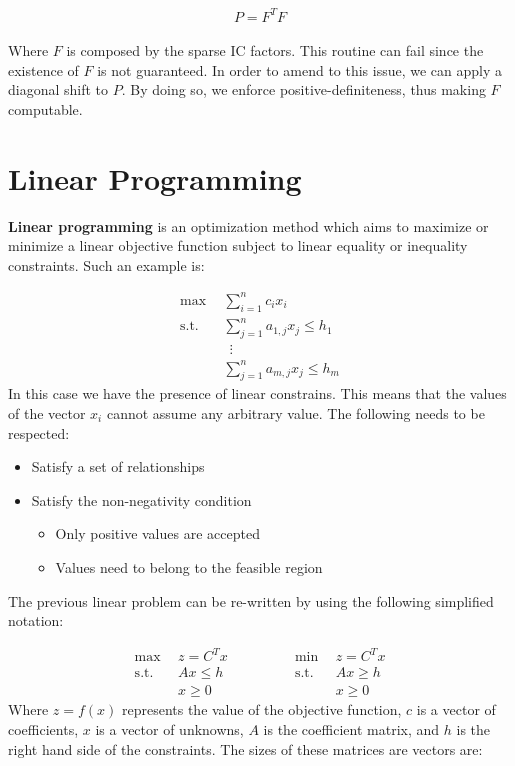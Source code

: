 \documentclass{article}
\begin{document}
\[ P = F^TF \] \\
Where $F$ is composed by the sparse IC factors. This routine can fail since the existence of $F$ is not guaranteed. In order to amend to this issue, we can apply a diagonal shift to $P$. By doing so, we enforce positive-definiteness, thus making $F$ computable.

\section{Linear Programming}
\textbf{Linear programming} is an optimization method which aims to maximize or minimize a linear objective function subject to linear equality or inequality constraints. Such an example is:

\begin{align*}
	\max~~ & \sum_{i = 1}^n c_ix_i \\
	\text{s.t.}~~ & \sum_{j = 1}^n a_{1,j}x_j \leq h_1 \\
	~~&~~ \vdots \\
	~~& \sum_{j = 1}^n a_{m,j}x_j \leq h_m
\end{align*}
In this case we have the presence of linear constrains. This means that the values of the vector $x_i$ cannot assume any arbitrary value. The following needs to be respected:

\begin{itemize}
	\item Satisfy a set of relationships
	\item Satisfy the non-negativity condition
	\begin{itemize}
		\item Only positive values are accepted
		\item Values need to belong to the feasible region
	\end{itemize}
\end{itemize}
The previous linear problem can be re-written by using the following simplified notation:

\begin{equation*}
  \begin{split}
    \max~~ & z = C^Tx \\
	\text{s.t.}~~ & Ax \leq h \\
	~~& x \geq 0
  \end{split}
\quad\quad\quad\quad
  \begin{split}
    \min~~ & z = C^Tx \\
	\text{s.t.}~~ & Ax \geq h \\
	~~& x \geq 0
  \end{split}
\end{equation*}
Where $z = f(x)$ represents the value of the objective function, $c$ is a vector of coefficients, $x$ is a vector of unknowns, $A$ is the coefficient matrix, and $h$ is the right hand side of the constraints. The sizes of these matrices are vectors are:
\end{document}
